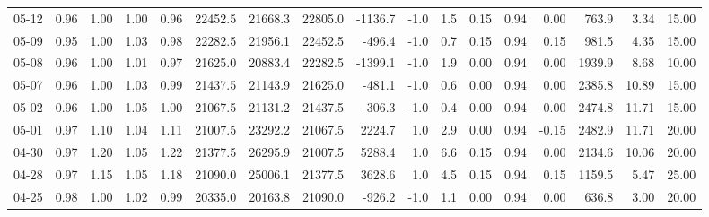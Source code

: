 \begin{threeparttable}
{\begin{tabular}{lrrrrrrrrrrrrrrrr}
  05-12 &         0.96 &           1.00 &          1.00 &          0.96 & 22452.5 & 21668.3 & 22805.0 &    -1136.7 &                     -1.0 &                 1.5 &       0.15 &      0.94 &           0.00 &            763.9 &            3.34 &                  15.00 \\
  05-09 &         0.95 &           1.00 &          1.03 &          0.98 & 22282.5 & 21956.1 & 22452.5 &     -496.4 &                     -1.0 &                 0.7 &       0.15 &      0.94 &           0.15 &            981.5 &            4.35 &                  15.00 \\
  05-08 &         0.96 &           1.00 &          1.01 &          0.97 & 21625.0 & 20883.4 & 22282.5 &    -1399.1 &                     -1.0 &                 1.9 &       0.00 &      0.94 &           0.00 &           1939.9 &            8.68 &                  10.00 \\
  05-07 &         0.96 &           1.00 &          1.03 &          0.99 & 21437.5 & 21143.9 & 21625.0 &     -481.1 &                     -1.0 &                 0.6 &       0.00 &      0.94 &           0.00 &           2385.8 &           10.89 &                  15.00 \\
  05-02 &         0.96 &           1.00 &          1.05 &          1.00 & 21067.5 & 21131.2 & 21437.5 &     -306.3 &                     -1.0 &                 0.4 &       0.00 &      0.94 &           0.00 &           2474.8 &           11.71 &                  15.00 \\
  05-01 &         0.97 &           1.10 &          1.04 &          1.11 & 21007.5 & 23292.2 & 21067.5 &     2224.7 &                      1.0 &                 2.9 &       0.00 &      0.94 &          -0.15 &           2482.9 &           11.71 &                  20.00 \\
  04-30 &         0.97 &           1.20 &          1.05 &          1.22 & 21377.5 & 26295.9 & 21007.5 &     5288.4 &                      1.0 &                 6.6 &       0.15 &      0.94 &           0.00 &           2134.6 &           10.06 &                  20.00 \\
  04-28 &         0.97 &           1.15 &          1.05 &          1.18 & 21090.0 & 25006.1 & 21377.5 &     3628.6 &                      1.0 &                 4.5 &       0.15 &      0.94 &           0.15 &           1159.5 &            5.47 &                  25.00 \\
  04-25 &         0.98 &           1.00 &          1.02 &          0.99 & 20335.0 & 20163.8 & 21090.0 &     -926.2 &                     -1.0 &                 1.1 &       0.00 &      0.94 &           0.00 &            636.8 &            3.00 &                  20.00 \\

\end{tabular}}
\end{threeparttable}
